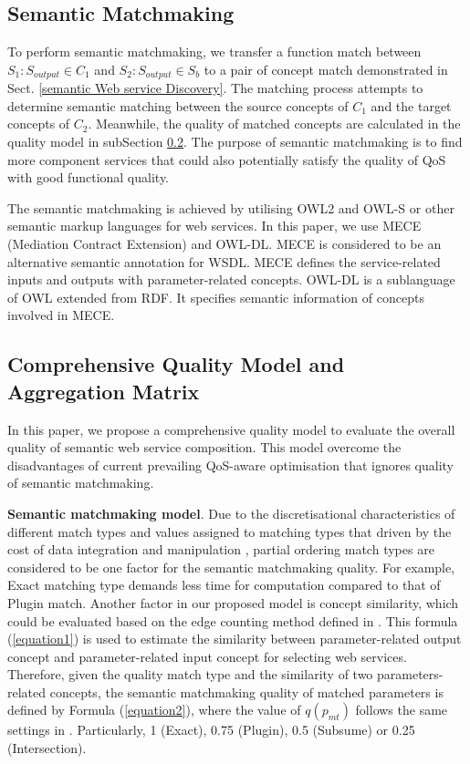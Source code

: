 \documentclass{IEEEtran}
\begin{document}
\subsection{Semantic Matchmaking} \label{semantic_matchmaking}
To perform semantic matchmaking, we transfer a function match between $S_{1}: S_{output} \in C_{1}$ and $S_{2}:S_{output} \in S_{b}$ to a pair of concept match demonstrated in Sect. \ref{semantic Web service Discovery}. The matching process attempts to determine semantic matching between the source concepts of $C_{1}$ and the target concepts of $C_{2}$. Meanwhile, the quality of matched concepts are calculated in the quality model in subSection \ref{qualityModel}. The purpose of semantic matchmaking is to find more component services that could also potentially satisfy the quality of QoS with good functional quality.

The semantic matchmaking is achieved by utilising OWL2 and OWL-S or other semantic markup languages for web services. In this paper, we use MECE (Mediation Contract Extension) \cite{bleul2008self} and OWL-DL. MECE is considered to be an alternative semantic annotation for WSDL. MECE defines the service-related inputs and outputs with parameter-related concepts. OWL-DL is a sublanguage of OWL extended from RDF. It specifies semantic information of concepts involved in MECE. 
\vspace{-0.5cm}
\subsection{Comprehensive Quality Model and Aggregation Matrix}\label{qualityModel}
In this paper, we propose a comprehensive quality model to evaluate the overall quality of semantic web service composition. This model overcome the disadvantages of current prevailing QoS-aware optimisation \cite{bansal2016generalized,mier2015integrated,da2016particle,da2015graphevol,yu2013adaptive} that ignores quality of semantic matchmaking.

\textbf{Semantic matchmaking model}. Due to the discretisational characteristics of different match types and values assigned to matching types that driven by the cost of data integration and manipulation \cite{lecue2009optimizing}, partial ordering match types are considered to be one factor for the semantic matchmaking quality. For example, Exact matching type demands less time for computation compared to that of Plugin match. Another factor in our proposed model is concept similarity, which could be evaluated based on the edge counting method defined in \cite{shet2012new}. This formula (\ref{equation1}) is used to estimate the similarity between parameter-related output concept and parameter-related input concept for selecting web services. Therefore, given the quality match type and the similarity of two parameters-related concepts, the semantic matchmaking quality of matched parameters is defined by Formula (\ref{equation2}), where the value of $q(p_ {mt})$ follows the same settings in \cite{lecue2009optimizing}. Particularly, 1 (Exact), 0.75 (Plugin), 0.5 (Subsume) or 0.25 (Intersection). 
\end{document}
